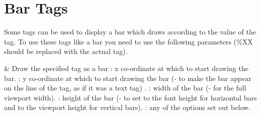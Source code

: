 \section{\label{ref:bar_tags}Bar Tags}
  Some tags can be used to display a bar which draws according to the value of
  the tag. To use these tags like a bar you need to use the following parameters
  (\%XX should be replaced with the actual tag).


\begin{tagmap}
    & Draw the specified tag as a bar\newline
      : x co-ordinate at which to start drawing the bar.\newline
      : y co-ordinate at which to start drawing the bar (- to make the
        bar appear on the line of the tag, as if it was a text tag) .\newline
      : width of the bar (- for the full viewport width).\newline
      : height of the bar (- to set to the font height for
        horizontal bars and to the viewport height for vertical bars).\newline
      : any of the options set out below.\\
\end{tagmap}

